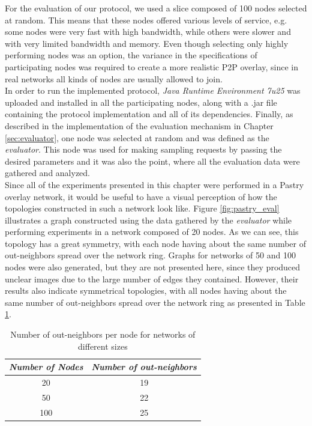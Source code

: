 \documentclass[a4paper,11pt,twoside]{report}
\begin{document}
For the evaluation of our protocol, we used a slice composed of 100 nodes selected at random. This means that these nodes offered various levels of service, e.g. some nodes were very fast with high bandwidth, while others were slower and with very limited bandwidth and memory. Even though selecting only highly performing nodes was an option, the variance in the specifications of participating nodes was required to create a more realistic P2P overlay, since in real networks all kinds of nodes are usually allowed to join.\\

In order to run the implemented protocol, \textit{Java Runtime Environment 7u25} was uploaded and installed in all the participating nodes, along with a .jar file containing the protocol implementation and all of its dependencies. Finally, as described in the implementation of the evaluation mechanism in Chapter \ref{sec:evaluator}, one node was selected at random and was defined as the \textit{evaluator}. This node was used for making sampling requests by passing the desired parameters and it was also the point, where all the evaluation data were gathered and analyzed. \\

Since all of the experiments presented in this chapter were performed in a Pastry overlay network, it would be useful to have a visual perception of how the topologies constructed in such a network look like. Figure \ref{fig:pastry_eval} illustrates a graph constructed using the data gathered by the \textit{evaluator} while performing experiments in a network composed of 20 nodes. As we can see, this topology has a great symmetry, with each node having about the same number of out-neighbors spread over the network ring. Graphs for networks of 50 and 100 nodes were also generated, but they are not presented here, since they produced unclear images due to the large number of edges they contained. However, their results also indicate symmetrical topologies, with all nodes having about the same number of out-neighbors spread over the network ring as presented in Table \ref{table:topology_sizes}.

\begin{table}[b]
     \centering
   	\begin{tabular}{|c|c|}
   	\hline
   \textbf{\textit{Number of Nodes}} & \textbf{\textit{Number of out-neighbors}}\\
   	\hline
   	\hline
   	 20 & 19\\
   	 \hline
     50 & 22\\
     \hline
     100 & 25\\
       \hline
     	\end{tabular}
     	\caption{Number of out-neighbors per node for networks of different sizes}
     	\label{table:topology_sizes}
\end{table}
\end{document}
